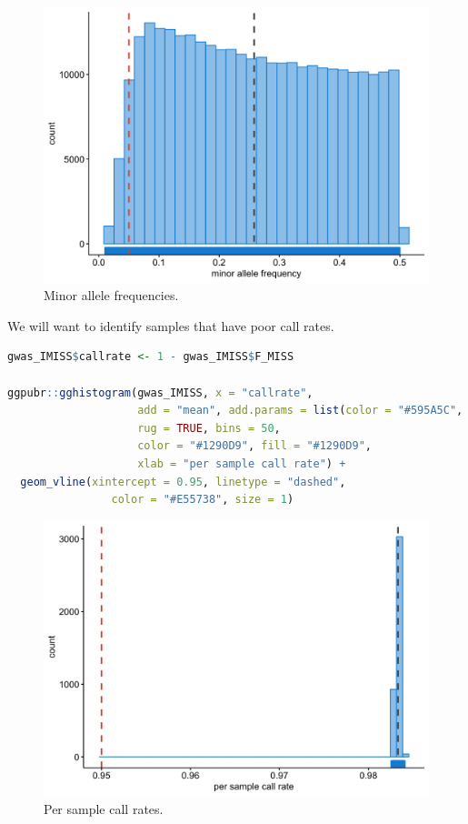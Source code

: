 \documentclass[
]{book}
\begin{document}
\begin{figure}

{\centering \includegraphics[width=18.67in]{img/show-freq-gwas} 

}

\caption{Minor allele frequencies.}\label{fig:show-freq-gwas}
\end{figure}

We will want to identify samples that have poor call rates.

\begin{lstlisting}[language=R]
gwas_IMISS$callrate <- 1 - gwas_IMISS$F_MISS

ggpubr::gghistogram(gwas_IMISS, x = "callrate",
                    add = "mean", add.params = list(color = "#595A5C", linetype = "dashed", size = 1),
                    rug = TRUE, bins = 50,
                    color = "#1290D9", fill = "#1290D9",
                    xlab = "per sample call rate") +
  geom_vline(xintercept = 0.95, linetype = "dashed",
                color = "#E55738", size = 1)
\end{lstlisting}

\begin{figure}

{\centering \includegraphics[width=18.67in]{img/show-sample-callrate-gwas} 

}

\caption{Per sample call rates.}\label{fig:show-sample-callrate-gwas}
\end{figure}
\end{document}
